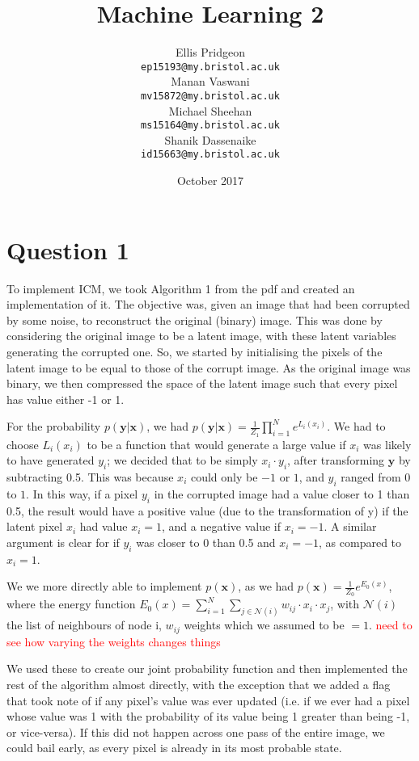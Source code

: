 \documentclass{article}
\date{October 2017}
\title{Machine Learning 2 }
\author{
Ellis Pridgeon \\
\texttt{ep15193@my.bristol.ac.uk} \\
\And
Manan Vaswani \\
\texttt{mv15872@my.bristol.ac.uk} \\
\AND
Michael Sheehan \\
\texttt{ms15164@my.bristol.ac.uk} \\
\And
Shanik Dassenaike \\
\texttt{id15663@my.bristol.ac.uk}
}
\begin{document}
\vspace*{-80pt}
\maketitle

\section*{Question 1}
To implement ICM, we took Algorithm 1 from the pdf and created an implementation of it. The objective was, given an image that had been corrupted by some noise, to reconstruct the original (binary) image. This was done by considering the original image to be a latent image, with these latent variables generating the corrupted one. So, we started by initialising the pixels of the latent image to be equal to those of the corrupt image. As the original image was binary, we then compressed the space of the latent image such that every pixel has value either -1 or 1.

For the probability $p(\textbf{y}|\textbf{x})$, we had $p(\textbf{y}|\textbf{x}) = \frac{1}{Z_{1}} \prod_{i=1}^{N} e^{L_{i}(x_{i})}$. We had to choose $L_{i} (x_{i})$ to be a function that would generate a large value if $x_{i}$ was likely to have generated $y_{i}$; we decided that to be simply $x_{i} \cdot y_{i}$, after transforming $\textbf{y}$ by subtracting 0.5. This was because $x_{i}$ could only be $-1$ or $1$, and $y_{i}$ ranged from $0$ to $1$. In this way, if a pixel $y_{i}$ in the corrupted image had a value closer to 1 than 0.5, the result would have a positive value (due to the transformation of y) if the latent pixel $x_{i}$ had value $x_{i} = 1$, and a negative value if $x_{i} = -1$. A similar argument is clear for if $y_{i}$ was closer to 0 than 0.5 and $x_{i} = -1$, as compared to $x_{i} = 1$.

We we more directly able to implement $p(\textbf{x})$, as we had $p(\textbf{x}) = \frac{1}{Z_{0}} e^{E_{0}(x)}$, where the energy function $E_{0}(x) = \sum_{i=1}^{N} \sum_{j \in \mathcal{N}(i)} w_{ij} \cdot x_{i} \cdot x_{j}$, with $\mathcal{N}(i)$ the list of neighbours of node i, $w_{ij}$ weights which we assumed to be $= 1$. \textcolor{red}{need to see how varying the weights changes things}

We used these to create our joint probability function and then implemented the rest of the algorithm almost directly, with the exception that we added a flag that took note of if any pixel's value was ever updated (i.e. if we ever had a pixel whose value was 1 with the probability of its value being 1 greater than being -1, or vice-versa). If this did not happen across one pass of the entire image, we could bail early, as every pixel is already in its most probable state.
\end{document}
